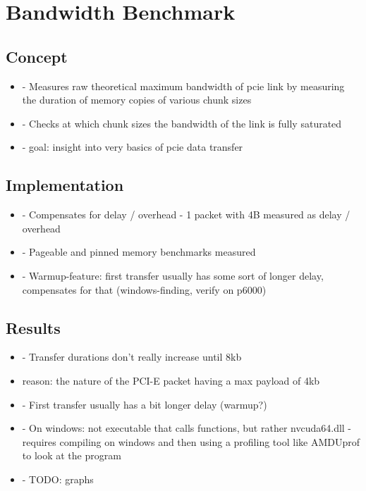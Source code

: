 
\chapter{Bandwidth Benchmark}\label{chapter:benchmark}

\section{Concept}
\begin{itemize}
	\item - Measures raw theoretical maximum bandwidth of pcie link by measuring the duration of memory copies of various chunk sizes
	\item - Checks at which chunk sizes the bandwidth of the link is fully saturated
	\item - goal: insight into very basics of pcie data transfer
\end{itemize}


\section{Implementation}
\begin{itemize}
	\item - Compensates for delay / overhead - 1 packet with 4B measured as delay / overhead
	\item - Pageable and pinned memory benchmarks measured
	\item - Warmup-feature: first transfer usually has some sort of longer delay, compensates for that (windows-finding, verify on p6000)
	
	
\end{itemize}

\section{Results}
\begin{itemize}
	\item - Transfer durations don’t really increase until 8kb
	\item reason: the nature of the PCI-E packet having a max payload of 4kb
	\item - First transfer usually has a bit longer delay (warmup?)
	\item - On windows: not executable that calls functions, but rather nvcuda64.dll - requires compiling on windows and then using a profiling tool like AMDUprof to look at the program
	\item - TODO: graphs
\end{itemize}


